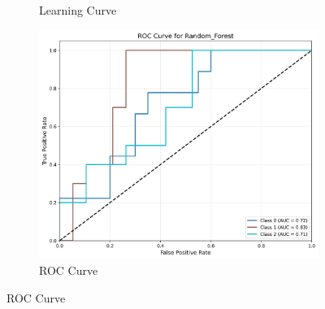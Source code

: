 \documentclass[10pt]{article}
\begin{document}
\begin{figure}[!ht]
\begin{subfigure}{0.33\textwidth}
            \caption{Learning Curve}
        \end{subfigure}
        \begin{subfigure}{0.33\textwidth}
            \centering
            \includegraphics[width=\textwidth]{code/ResultsMainAugZip/plots/Block1_Tree_Based_Experiment_II/roc_curve_Random_Forest.png}
            \caption{ROC Curve}
        \end{subfigure}
    \end{figure}
    
\end{document}
